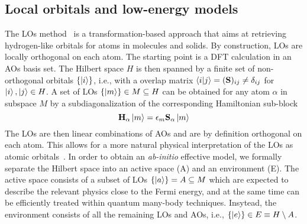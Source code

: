 \documentclass[aps,prx,twocolumn,superscriptaddress]{revtex4-2}
\begin{document}
\subsection{Local orbitals and low-energy models} \label{subec:los}
The LOs method~\cite{gandusJCP153} is a transformation-based approach that aims at retrieving hydrogen-like orbitals for atoms in molecules and solids. By construction, LOs are locally orthogonal on each atom.
The starting point is a DFT calculation in an AOs basis set. The Hilbert space $H$ is then spanned by a finite set of non-orthogonal orbitals $\{\ket{i}\}$, i.e., with a overlap matrix $\braket{i}{j}=(\mathbf{S})_{ij}\neq \delta_{ij}$ for $\ket{i}, \ket{j} \in H$. 
A set of LOs $\{\ket{m}\} \in M \subseteq H$ can be obtained for any atom $\alpha$ in subspace $M$ 
by a subdiagonalization of the corresponding Hamiltonian sub-block 
\begin{equation} \label{eq:HA}
    \mathbf{H}_{\alpha} \ket{m} = \epsilon_{m} \mathbf{S}_{\alpha} \ket{m}
\end{equation}
The LOs are then linear combinations of AOs and are by definition orthogonal on each atom. 
This allows for a more natural physical interpretation of the LOs as atomic orbitals~\cite{gandusJCP153}.
In order to obtain an \emph{ab-initio} effective model, we formally separate the Hilbert space into an active space (A) and an environment (E). The active space consists of a subset of LOs $\{\ket{a}\}=A \subseteq M$ 
which are expected to describe the relevant physics close to the Fermi energy, 
and at the same time can be efficiently treated within quantum many-body techniques. 
Insytead, the environment consists of all the remaining LOs and AOs, i.e., $\{\ket{e}\} \in E \equiv H \setminus A$. 
\end{document}
